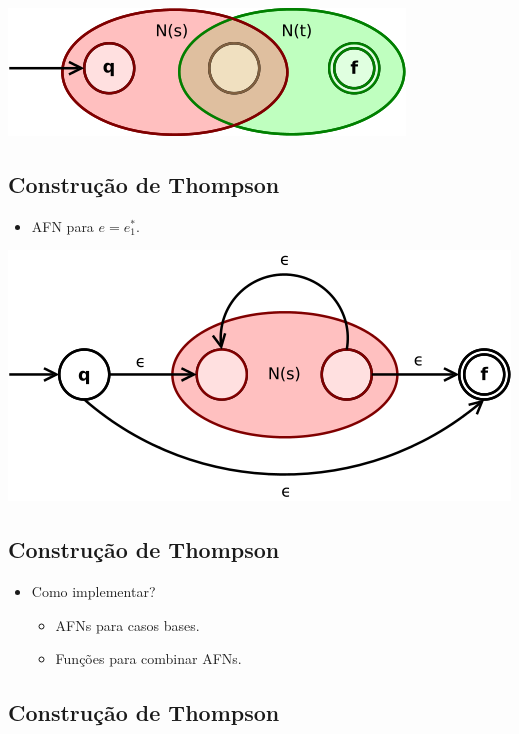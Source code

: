 \documentclass[11pt]{article}
\begin{document}
\begin{center}
\includegraphics[width=.9\linewidth]{./imgs/image5.png}
\end{center}
\subsection*{Construção de Thompson}
\label{sec:org4365e41}

\begin{itemize}
\item AFN para \(e = e_1^*\).
\end{itemize}

\begin{center}
\includegraphics[width=.9\linewidth]{./imgs/image6.png}
\end{center}
\subsection*{Construção de Thompson}
\label{sec:org3bed592}

\begin{itemize}
\item Como implementar?
\begin{itemize}
\item AFNs para casos bases.
\item Funções para combinar AFNs.
\end{itemize}
\end{itemize}
\subsection*{Construção de Thompson}
\label{sec:org937f273}
\end{document}
